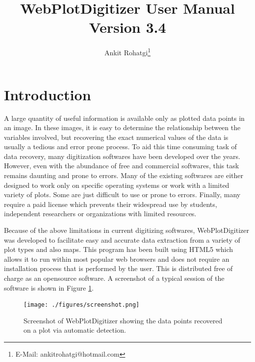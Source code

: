 \documentclass[letterpaper, 10pt]{article}
\begin{document}
\title{WebPlotDigitizer User Manual\\ Version 3.4}
\author{Ankit Rohatgi\footnote{E-Mail: ankitrohatgi@hotmail.com}}
\maketitle
\tableofcontents
\newpage
\section{Introduction}
A large quantity of useful information is available only as plotted data points in an image. In these images, it is easy to determine the relationship between the variables involved, but recovering the exact numerical values of the data is usually a tedious and error prone process. To aid this time consuming task of data recovery, many digitization softwares have been developed over the years. However, even with the abundance of free and commercial softwares, this task remains daunting and prone to errors. Many of the existing softwares are either designed to work only on specific operating systems or work with a limited variety of plots. Some are just difficult to use or prone to errors. Finally, many require a paid license which prevents their widespread use by students, independent researchers or organizations with limited resources.

Because of the above limitations in current digitizing softwares, WebPlotDigitizer was developed to facilitate easy and accurate data extraction from a variety of plot types and also maps. This program has been built using HTML5 which allows it to run within most popular web browsers and does not require an installation process that is performed by the user. This is distributed free of charge as an opensource software. A screenshot of a typical session of the software is shown in Figure \ref{fig:screenshot}.

\begin{figure}
\begin{center}
\texttt{[image: ./figures/screenshot.png]}
\caption{Screenshot of WebPlotDigitizer showing the data points recovered on a plot via automatic detection.}
\label{fig:screenshot}
\end{center}
\end{figure}
\end{document}
